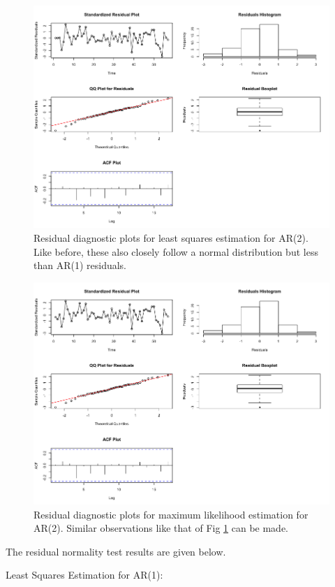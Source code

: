 \begin{enumerate}[label=(\alph*)]
\begin{figure}[!htb]
\end{figure}
\begin{figure}[!htb]
    \centering
    \includegraphics[width=\linewidth]{Images/P2/Residual_CSS_AR2.png}
    \caption[Residual diagnostic plots for least squares estimation for AR(2)]{Residual diagnostic plots for least squares estimation for AR(2). Like before, these also closely follow a normal distribution but less than AR(1) residuals.}
    \label{fig:residual_css_ar2}
\end{figure}
\begin{figure}[!htb]
    \centering
    \includegraphics[width=\linewidth]{Images/P2/Residual_ML_AR2.png}
    \caption[Residual diagnostic plots for maximum likelihood estimation for AR(2)]{Residual diagnostic plots for maximum likelihood estimation for AR(2). Similar observations like that of Fig \ref{fig:residual_css_ar2} can be made.}
\end{figure}
The residual normality test results are given below. \small\begin{block}
Least Squares Estimation for AR(1):


\end{block}
\end{enumerate}
